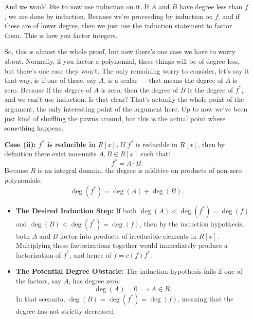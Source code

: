 \begin{proofWrapper}
\begin{speech}[00:27:36 - 00:29:34]
And we would like to now use induction on it. If $A$ and $B$ have degree less than $f$, we are done by induction.  Because we're proceeding by induction on $f$, and if these are of lower degree, then we just use the induction statement to factor them. This is how you factor integers.

So, this is almost the whole proof, but now there's one case we have to worry about. Normally, if you factor a polynomial, these things will be of degree less, but there's one case they won't. The only remaining worry to consider, let's say it that way,  is if one of these, say $A$, is a scalar --- that means the degree of $A$ is zero.  Because if the degree of $A$ is zero, then the degree of $B$ is the degree of $f^*$, and we can't use induction. Is that clear? That's actually the whole point of the argument, the only interesting point of the argument here. Up to now we've been just kind of shuffling the pawns around, but this is the actual point where something happens.
\end{speech}

\begin{content}
\textbf{Case (ii): $f^*$ is reducible in $R[x]$.}
If $f^*$ is reducible in $R[x]$, then by definition there exist non-units $A, B \in R[x]$ such that:
\begin{equation}\label{eq:fstar-AB}
f^* = A \cdot B.
\end{equation}
Because $R$ is an integral domain, the degree is additive on products of non-zero polynomials:
\[
\deg(f^*) = \deg(A) + \deg(B).
\]
\begin{itemize}
    \item \textbf{The Desired Induction Step:} If both $\deg(A) < \deg(f^*) = \deg(f)$ and $\deg(B) < \deg(f^*) = \deg(f)$, then by the induction hypothesis, both $A$ and $B$ factor into products of irreducible elements in $R[x]$. Multiplying these factorizations together would immediately produce a factorization of $f^*$, and hence of $f = c(f) f^*$.
    \item \textbf{The Potential Degree Obstacle:} The induction hypothesis fails if one of the factors, say $A$, has degree zero:
    \[
    \deg(A) = 0 \implies A \in R.
    \]
    In that scenario, $\deg(B) = \deg(f^*) = \deg(f)$, meaning that the degree has not strictly decreased.
\end{itemize}
\end{content}


\end{proofWrapper}
